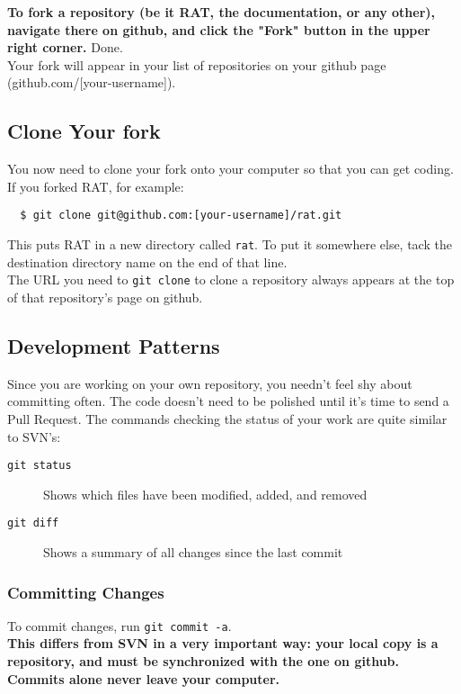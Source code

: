 \documentclass{article}
\begin{document}
{\bf To fork a repository (be it RAT, the documentation, or any other), navigate there on github, and click the "Fork" button in the upper right corner.} Done.\\

Your fork will appear in your list of repositories on your github page (github.com/[your-username]).

\subsection{Clone Your fork}
\label{clone-fork}
You now need to clone your fork onto your computer so that you can get coding. If you forked RAT, for example:
\begin{verbatim}
  $ git clone git@github.com:[your-username]/rat.git
\end{verbatim}
This puts RAT in a new directory called {\tt rat}. To put it somewhere else, tack the destination directory name on the end of that line.\\

The URL you need to {\tt git clone} to clone a repository always appears at the top of that repository's page on github.

\subsection{Development Patterns}
\label{patterns}
Since you are working on your own repository, you needn't feel shy about committing often. The code doesn't need to be polished until it's time to send a Pull Request. The commands checking the status of your work are quite similar to SVN's:
\begin{description}
\item[{\tt git status}] Shows which files have been modified, added, and removed
\item[{\tt git diff}] Shows a summary of all changes since the last commit
\end{description}

\subsubsection{Committing Changes}
To commit changes, run  {\tt git commit -a}.\\

{\bf This differs from SVN in a very important way: your local copy is a repository, and must be synchronized with the one on github. Commits alone never leave your computer.}\\
\end{document}
